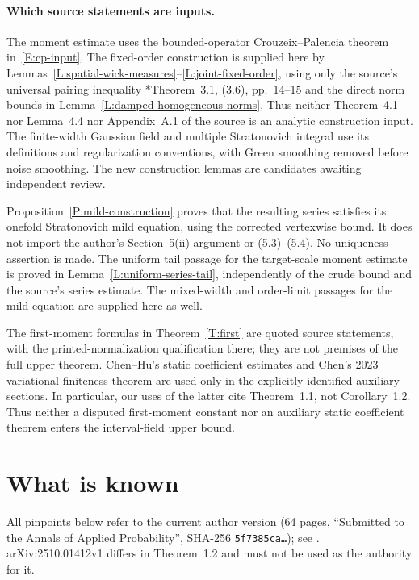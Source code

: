\documentclass[12pt]{article}
\numberwithin{equation}{section}
\theoremstyle{definition}
\begin{document}
\paragraph{Which source statements are inputs.}
The moment estimate uses the bounded-operator Crouzeix--Palencia
theorem in~\eqref{E:cp-input}. The fixed-order construction is supplied
here by Lemmas~\ref{L:spatial-wick-measures}--\ref{L:joint-fixed-order},
using only the source's universal pairing inequality
\cite{chen:author2026:time-dependency}*{Theorem~3.1, (3.6), pp.~14--15}
and the direct norm bounds in Lemma~\ref{L:damped-homogeneous-norms}.
Thus neither Theorem~4.1 nor Lemma~4.4 nor Appendix~A.1 of the source is
an analytic construction input. The finite-width Gaussian field and
multiple Stratonovich integral use its definitions and regularization
conventions, with Green smoothing removed before noise smoothing.
The new construction lemmas are candidates awaiting independent review.

Proposition~\ref{P:mild-construction} proves that the resulting series
satisfies its onefold Stratonovich mild equation, using the corrected
vertexwise bound. It does not import the author's Section~5(ii) argument
or (5.3)--(5.4). No uniqueness assertion is made. The uniform tail passage
for the target-scale moment estimate is proved in
Lemma~\ref{L:uniform-series-tail}, independently of the crude bound and
the source's series estimate. The mixed-width and order-limit passages
for the mild equation are supplied here as well.

The first-moment formulas in Theorem~\ref{T:first} are quoted source
statements, with the printed-normalization qualification there; they are
not premises of the full upper theorem. Chen--Hu's static coefficient
estimates and Chen's 2023 variational finiteness theorem are used only in
the explicitly identified auxiliary sections. In particular, our uses of
the latter cite Theorem~1.1, not Corollary~1.2. Thus neither a disputed
first-moment constant nor an auxiliary static coefficient theorem enters
the interval-field upper bound.

\section{What is known}\label{S:known}

All pinpoints below refer to the current author version
\cite{chen:author2026:time-dependency} (64 pages, ``Submitted to the Annals
of Applied Probability'', SHA-256 \texttt{5f7385ca\dots}); see
. arXiv:2510.01412v1
\cite{chen:25:time-dependency} differs in Theorem~1.2 and must not be used as
the authority for it.
\end{document}
